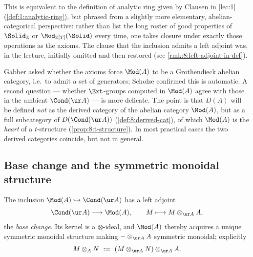 \begin{remark}
\label{rmk:8:equivalent-L1}
This is equivalent to the definition of analytic ring given by Clausen in
\cref{lec:1} (\cref{def:1:analytic-ring}), but phrased from a slightly more
elementary, abelian-categorical perspective: rather than list the long roster of
good properties of $\Solid_{\mathbb{Z}}$ or $\Mod_{\mathbb{Z}[T]}(\Solid)$ every
time, one takes closure under exactly those operations as the axioms. The clause
that the inclusion admits a left adjoint was, in the lecture, initially omitted
and then restored (see \cref{rmk:8:left-adjoint-in-def}).
\end{remark}

\begin{remark}
\label{rmk:8:grothendieck-heart}
Gabber asked whether the axioms force $\Mod(A)$ to be a Grothendieck abelian
category, i.e.\ to admit a set of generators; Scholze confirmed this is automatic.
A second question --- whether $\Ext$-groups computed in $\Mod(A)$ agree with those
in the ambient $\Cond(\ur A)$ --- is more delicate. The point is that $D(A)$ will
be defined \emph{not} as the derived category of the abelian category $\Mod(A)$,
but as a full subcategory of $D(\Cond(\ur A))$ (\cref{def:8:derived-cat}), of which
$\Mod(A)$ is the \emph{heart} of a $t$-structure (\cref{prop:8:t-structure}). In
most practical cases the two derived categories coincide, but not in general.
\end{remark}

\subsection{Base change and the symmetric monoidal structure}

\begin{proposition}
\label{prop:8:base-change}
The inclusion $\Mod(A)\hookrightarrow\Cond(\ur A)$ has a left adjoint
\begin{equation*}
\Cond(\ur A)\longrightarrow\Mod(A),\qquad M\longmapsto M\otimes_{\ur A}A,
\end{equation*}
the \emph{base change}. Its kernel is a $\otimes$-ideal, and $\Mod(A)$ thereby
acquires a unique symmetric monoidal structure making $-\otimes_{\ur A}A$
symmetric monoidal; explicitly
\begin{equation}
\label{eq:8:tensor-A}
M\otimes_{A}N\ :=\ (M\otimes_{\ur A}N)\otimes_{\ur A}A .
\end{equation}
\end{proposition}


